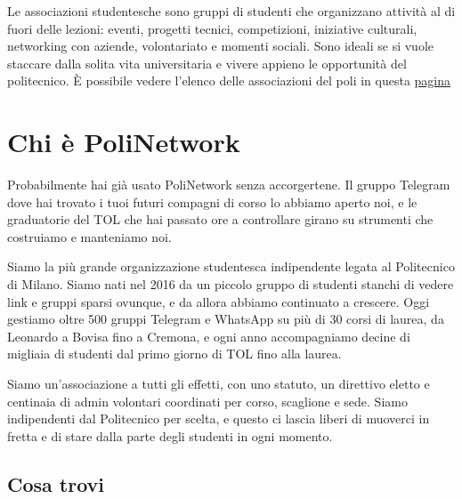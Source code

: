 \documentclass[legal]{polinetwork}
\begin{document}
Le associazioni studentesche sono gruppi di studenti che organizzano attività al di fuori delle lezioni: eventi, progetti tecnici, competizioni, iniziative culturali, networking con aziende, volontariato e momenti sociali. Sono ideali se si vuole staccare dalla solita vita universitaria e vivere appieno le opportunità del politecnico. È possibile vedere l'elenco delle associazioni del poli in questa \href{https://www.polimi.it/studenti/associazioni-degli-studenti}{pagina}

\section{Chi è PoliNetwork}


Probabilmente hai già usato PoliNetwork senza accorgertene. Il gruppo Telegram dove hai trovato i tuoi futuri compagni di corso lo abbiamo aperto noi, e le graduatorie del TOL che hai passato ore a controllare girano su strumenti che costruiamo e manteniamo noi.

Siamo la più grande organizzazione studentesca indipendente legata al Politecnico di Milano. Siamo nati nel 2016 da un piccolo gruppo di studenti stanchi di vedere link e gruppi sparsi ovunque, e da allora abbiamo continuato a crescere. Oggi gestiamo oltre 500 gruppi Telegram e WhatsApp su più di 30 corsi di laurea, da Leonardo a Bovisa fino a Cremona, e ogni anno accompagniamo decine di migliaia di studenti dal primo giorno di TOL fino alla laurea.

Siamo un'associazione a tutti gli effetti, con uno statuto, un direttivo eletto e centinaia di admin volontari coordinati per corso, scaglione e sede. Siamo indipendenti dal Politecnico per scelta, e questo ci lascia liberi di muoverci in fretta e di stare dalla parte degli studenti in ogni momento.

\subsection{Cosa trovi}
\end{document}
